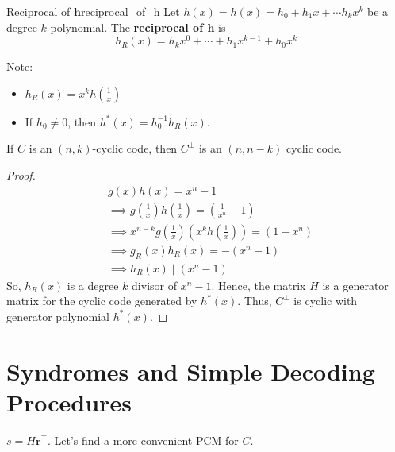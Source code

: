 \begin{Definition}{Reciprocal of $\bm{h}$}{reciprocal_of_h}
    Let $ h(x)=h(x)=h_{0}+h_{1} x+\cdots h_k x^{k} $ be a degree $ k $
    polynomial. The \textbf{reciprocal of $\bm{h}$} is
    \[ h_{R}(x)=h_k x^{0}+\cdots+h_{1}x^{k-1}+h_{0}x^{k} \]
\end{Definition}

Note:
\begin{itemize}
    \item $ h_R(x)=x^k h\left( \frac{1}{x} \right) $
    \item If $ h_0\neq 0 $, then $ h^*(x)=h_{0}^{-1}h_R(x) $.
\end{itemize}

\begin{Theorem}{}{}
    If $ C $ is an $ (n,k) $-cyclic code, then $ C^{\perp} $ is an
    $ (n,n-k) $ cyclic code.
\end{Theorem}

\begin{proof}
    \begin{align*}
         & g(x)h(x)=x^n-1                                                                                   \\
         & \implies g\left( \frac{1}{x} \right)h\left( \frac{1}{x}  \right)= \left( \frac{1}{x^n}-1 \right) \\
         & \implies x^{n-k}g\left( \frac{1}{x}  \right)\left( x^k h\left( \frac{1}{x} \right) \right)=
        (1-x^n)                                                                                             \\
         & \implies g_R(x)h_R(x)=-(x^n-1)                                                                   \\
         & \implies h_R(x)\mid (x^n-1)
    \end{align*}
    So, $ h_R(x) $ is a degree $ k $ divisor of $ x^n-1 $. Hence, the matrix
    $ H $ is a generator matrix for the cyclic code generated by $ h^*(x) $.
    Thus, $ C^{\perp} $ is cyclic with generator polynomial $ h^*(x) $.
\end{proof}

\section{Syndromes and Simple Decoding Procedures}
$ s=H\bm{r}^\top $. Let's find a more convenient PCM for $ C $.


